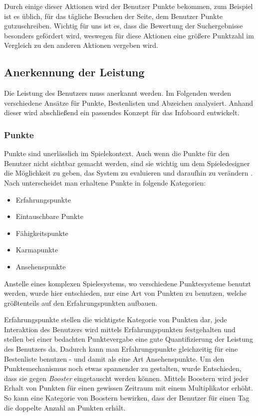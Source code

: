 \documentclass[12pt,twoside]{book}
\begin{document}
Durch einige dieser Aktionen wird der Benutzer Punkte bekommen, zum Beispiel ist es üblich, für das tägliche Besuchen der Seite, dem Benutzer Punkte gutzuschreiben. Wichtig für uns ist es, dass die Bewertung der Suchergebnisse besonders gefördert wird, weswegen für diese Aktionen eine größere Punktzahl im Vergleich zu den anderen Aktionen vergeben wird.

\subsection{Anerkennung der Leistung}

Die Leistung des Benutzers muss anerkannt werden. Im Folgenden werden verschiedene Ansätze für Punkte, Bestenlisten und Abzeichen analysiert. Anhand dieser wird abschließend ein passendes Konzept für das Infoboard entwickelt.

\subsubsection*{Punkte}

Punkte sind unerlässlich im Spielekontext. Auch wenn die Punkte für den Benutzer nicht sichtbar gemacht werden, sind sie wichtig um dem Spieledesigner die Möglichkeit zu geben, das System zu evaluieren und daraufhin zu verändern \citep[pp. 36]{zichermann2011gamification}. Nach \citep[pp. 38]{zichermann2011gamification} unterscheidet man erhaltene Punkte in folgende Kategorien:

\begin{itemize}
	\item Erfahrungspunkte
    \item Eintauschbare Punkte
    \item Fähigkeitspunkte
    \item Karmapunkte
    \item Ansehenspunkte
\end{itemize}

Anstelle eines komplexen Spielesystems, wo verschiedene Punktesysteme benutzt werden, wurde hier entschieden, nur eine Art von Punkten zu benutzen, welche größtenteils auf den Erfahrungspunkten aufbauen.

Erfahrungspunkte stellen die wichtigste Kategorie von Punkten dar, jede Interaktion des Benutzers wird mittels Erfahrungspunkten festgehalten \citep[38 - 39]{zichermann2011gamification} und stellen bei einer bedachten Punktevergabe  eine gute Quantifizierung der Leistung des Benutzers da. Dadurch kann man Erfahrungspunkte gleichzeitig für eine Bestenliste benutzen - und damit als eine Art Ansehenspunkte. Um den Punktemechanismus noch etwas spannender zu gestalten, wurde Entschieden, dass sie gegen \textit{Booster} eingetauscht werden können. Mittels Boostern wird jeder Erhalt von Punkten für einen gewissen Zeitraum mit einem Multiplikator erhöht. So kann eine Kategorie von Boostern bewirken, dass der Benutzer für einen Tag die doppelte Anzahl an Punkten erhält.
\end{document}
